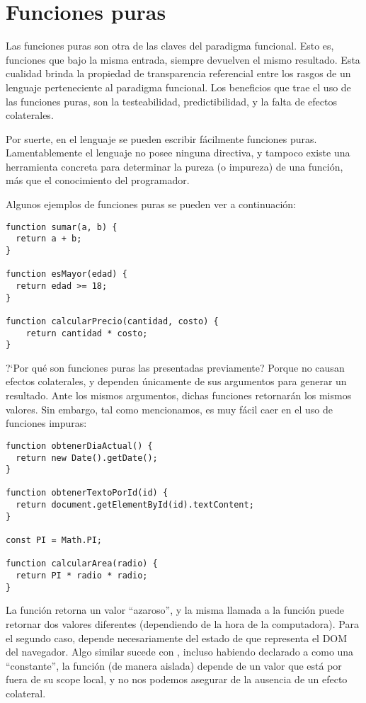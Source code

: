 \section{Funciones puras}

Las funciones puras son otra de las claves del paradigma funcional. Esto es, funciones que bajo la misma entrada, siempre devuelven el mismo resultado. Esta cualidad brinda la propiedad de transparencia referencial entre los rasgos de un lenguaje perteneciente al paradigma funcional. Los beneficios que trae el uso de las funciones puras, son la testeabilidad, predictibilidad, y la falta de efectos colaterales.

Por suerte, en el lenguaje se pueden escribir fácilmente funciones puras. Lamentablemente el lenguaje no posee ninguna directiva, y tampoco existe una herramienta concreta para determinar la pureza (o impureza) de una función, más que el conocimiento del programador.

Algunos ejemplos de funciones puras se pueden ver a continuación:

\begin{lstlisting}[title={Funciones puras}]
function sumar(a, b) {
  return a + b;
}

function esMayor(edad) {
  return edad >= 18;
}

function calcularPrecio(cantidad, costo) {
	return cantidad * costo;
}
\end{lstlisting}

?`Por qué son funciones puras las presentadas previamente? Porque no causan efectos colaterales, y dependen únicamente de sus argumentos para generar un resultado. Ante los mismos argumentos, dichas funciones retornarán los mismos valores. Sin embargo, tal como mencionamos, es muy fácil caer en el uso de funciones impuras:

\begin{lstlisting}[title={Funciones impuras}]
function obtenerDiaActual() {
  return new Date().getDate();
}

function obtenerTextoPorId(id) {
  return document.getElementById(id).textContent;
}

const PI = Math.PI;

function calcularArea(radio) {
  return PI * radio * radio;
}
\end{lstlisting}

La función  retorna un valor "`azaroso"', y la misma llamada a la función puede retornar dos valores diferentes (dependiendo de la hora de la computadora). Para el segundo caso,  depende necesariamente del estado de  que representa el DOM del navegador. Algo similar sucede con , incluso habiendo declarado a  como una "`constante"', la función (de manera aislada) depende de un valor que está por fuera de su scope local, y no nos podemos asegurar de la ausencia de un efecto colateral.

